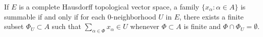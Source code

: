 If $E$ is a complete Hausdorff topological vector space, a family $\{x_\alpha : \alpha \in A\}$ is summable if and only if for each $0$-neighborhood $U$ in $E$, there exists a finite subset $\Phi_U \subset A$ such that $\sum_{\alpha \in \Phi} x_\alpha \in U$ whenever $\Phi \subset A$ is finite and $\Phi \cap \Phi_U = \emptyset$.
